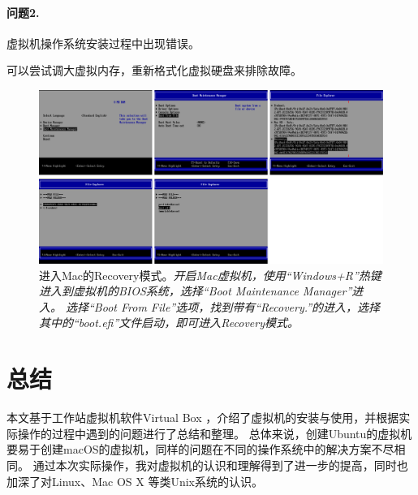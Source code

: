 \documentclass[final]{cvpr}
\newcommand{\mypara}[1]{\paragraph{#1.}}
\begin{document}
\mypara{问题2}  虚拟机操作系统安装过程中出现错误。

可以尝试调大虚拟内存，重新格式化虚拟硬盘来排除故障。


\begin{figure}[t]
  \centering
  \includegraphics[width=\textwidth]{bios.pdf}
  \caption{进入Mac的Recovery模式。\textit{开启Mac虚拟机，使用“Windows+R”热键进入到虚拟机的BIOS系统，选择“Boot Maintenance Manager”进入。
  选择“Boot From File”选项，找到带有“Recovery.”的进入，选择其中的“boot.efi”文件启动，即可进入Recovery模式。}}\label{fig:bios}
\end{figure}


\section{总结}\label{sec:Conclusion}

本文基于工作站虚拟机软件Virtual Box ，介绍了虚拟机的安装与使用，并根据实际操作的过程中遇到的问题进行了总结和整理。
总体来说，创建Ubuntu的虚拟机要易于创建macOS的虚拟机，同样的问题在不同的操作系统中的解决方案不尽相同。
通过本次实际操作，我对虚拟机的认识和理解得到了进一步的提高，同时也加深了对Linux、Mac OS X 等类Unix系统的认识。

\cleardoublepage \def\cleardoublepage{\clearpage\if@twoside \ifodd\c@page\else \hbox{}\newpage\if@twocolumn\hbox{}\newpage\fi\fi\fi}

{\small


}


\end{document}
